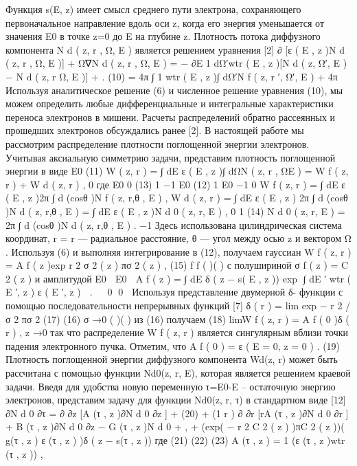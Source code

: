 Функция s(E, z) имеет смысл среднего пути электрона, сохраняющего первоначальное
направление вдоль оси z, когда его энергия уменьшается от значения E0 в точке z=0 до E
на глубине z.
Плотность потока диффузного компонента N d ( z, r , Ω, E ) является решением
уравнения [2]
∂
[ε ( E , z )N d ( z, r , Ω, E )] + Ω∇N d ( z, r , Ω, E ) =
−
∂E
1
dΩ′wtr ( E , z )[N d ( z, Ω′, E ) − N d ( z, r Ω, E )] + .
(10)
=
4π ∫
1
wtr ( E , z )∫ dΩ′N f ( z, r ′, Ω′, E )
+
4π
Используя аналитическое решение (6) и численное решение уравнения (10), мы
можем определить любые дифференциальные и интегральные характеристики переноса
электронов в мишени. Расчеты распределений обратно рассеянных и прошедших
электронов обсуждались ранее [2]. В настоящей работе мы рассмотрим распределение
плотности поглощенной энергии электронов.
Учитывая аксиальную симметрию задачи, представим плотность поглощенной
энергии в виде
E0
(11)
W ( z, r ) = ∫ dE ε ( E , z )∫ dΩN ( z, r , ΩE ) = W f ( z, r ) + W d ( z, r ) ,
0
где
E0 0 
(13)
1 −1 E0 
(12)
1 E0
−1 0
W f ( z, r ) = ∫ dE ε ( E , z )2π ∫ d (cosθ )N f ( z, r,θ , E ) ,
W d ( z, r ) = ∫ dE ε ( E , z ) 2π ∫ d (cosθ )N d ( z, r,θ , E ) = ∫ dE ε ( E , z )N d 0 ( z, r, E ) ,
0
1
(14)
N d 0 ( z, r, E ) = 2π ∫ d (cosθ )N d ( z, r,θ , E ) .
−1
Здесь использована цилиндрическая система координат,
r = r
— радиальное
расстояние, θ — угол между осью z и вектором Ω .
Используя (6) и выполняя интегрирование в (12), получаем гауссиан
W f ( z, r ) = A f ( z )exp r 2 σ 2 ( z ) πσ 2 ( z ) ,
(15)
f
f
(
)(
)
с полушириной σ f ( z ) = C 2 ( z ) и амплитудой
E0
 E0

A f ( z ) = ∫ dE δ ( z − s( E , z )) exp ∫ dE ′ wtr ( E ′, z ) ε ( E ′, z )  .


0
0

Используя представление двумерной δ- функции с помощью последовательности
непрерывных функций [7]
δ ( r ) = lim exp − r 2 / σ 2 πσ 2
(17)
(16)
σ →0
(
)( )
из (16) получаем
(18)
limW f ( z, r ) = A f ( 0 )δ ( r ) ,
z →0
так что распределение W f ( z, r ) является сингулярным вблизи точки падения
электронного пучка. Отметим, что
A f ( 0 ) = ε ( E = 0, z = 0 ) .
(19)
Плотность поглощенной энергии диффузного компонента Wd(z, r) может быть
рассчитана с помощью функции Nd0(z, r, E), которая является решением краевой задачи.
Введя для удобства новую переменную τ=E0-E – остаточную энергию электронов,
представим задачу для функции Nd0(z, r, τ) в стандартном виде [12]
∂N d 0 ∂τ = ∂ ∂z [A (τ , z )∂N d 0 ∂z ] +
(20)
+ (1 r ) ∂ ∂r [rA (τ , z )∂N d 0 ∂r ] + B (τ , z )∂N d 0 ∂z − G (τ , z )N d 0 + ,
+ (exp( − r 2 C 2 ( z ) )πC 2 ( z ))( g(τ , z ) ε (τ , z ) )δ ( z − s(τ , z ))
где
(21)
(22)
(23)
A (τ , z ) = 1 (ε (τ , z )wtr (τ , z )) ,
